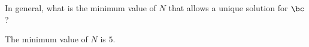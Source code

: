 \begin{problem}
\begin{enumalph}
\begin{answer}
        
      \end{answer}
    \item In general, what is the minimum value of $N$ that
      allows a unique solution for $\bc$?
      \begin{answer}
        The minimum value of $N$ is $5$.


\end{answer}
\end{enumalph}
\end{problem}
